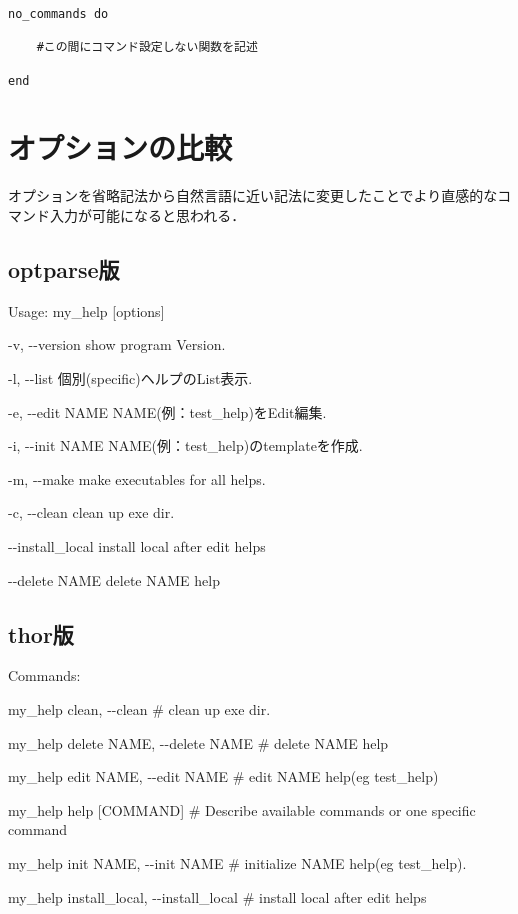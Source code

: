 \begin{verbatim}
no_commands do

    #この間にコマンド設定しない関数を記述

end
\end{verbatim}

\section{オプションの比較}\label{ux30aaux30d7ux30b7ux30e7ux30f3ux306eux6bd4ux8f03}

オプションを省略記法から自然言語に近い記法に変更したことでより直感的なコマンド入力が可能になると思われる．

\subsection{optparse版}\label{optparseux7248}

Usage: my\_help {[}options{]}

-v, -\/-version show program Version.

-l, -\/-list 個別(specific)ヘルプのList表示.

-e, -\/-edit NAME NAME(例：test\_help)をEdit編集.

-i, -\/-init NAME NAME(例：test\_help)のtemplateを作成.

-m, -\/-make make executables for all helps.

-c, -\/-clean clean up exe dir.

-\/-install\_local install local after edit helps

-\/-delete NAME delete NAME help

\subsection{thor版}\label{thorux7248}

Commands:

my\_help clean, -\/-clean \# clean up exe dir.

my\_help delete NAME, -\/-delete NAME \# delete NAME help

my\_help edit NAME, -\/-edit NAME \# edit NAME help(eg test\_help)

my\_help help {[}COMMAND{]} \# Describe available commands or one
specific command

my\_help init NAME, -\/-init NAME \# initialize NAME help(eg
test\_help).

my\_help install\_local, -\/-install\_local \# install local after edit
helps

